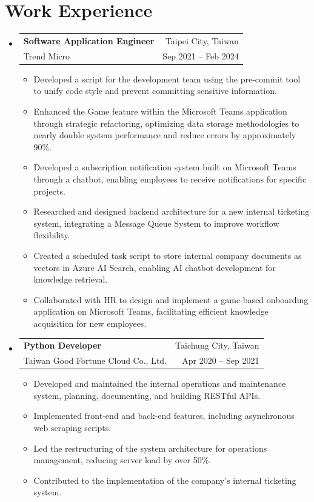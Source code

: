 \documentclass[letterpaper,12pt]{article}
\makeatletter
\newcommand{\resumeItemNH}[1]{
  \item\small{
    {#1 \vspace{-2pt}}
  }
}
\newcommand{\resumeSubheading}[4]{
  \vspace{0pt}\item
    \begin{tabular*}{\textwidth}{l@{\extracolsep{\fill}}r}
      \textbf{#1} & #2 \\
      \small#3 & \small#4 \\
    \end{tabular*}\vspace{-6pt}
}
\newcommand{\resumeSubHeadingListStart}{\begin{itemize}[leftmargin=0pt,label={}]}
\newcommand{\resumeSubHeadingListEnd}{\end{itemize}}
\newcommand{\resumeItemListStart}{\begin{itemize}[leftmargin=*]}
\newcommand{\resumeItemListEnd}{\end{itemize}}
\makeatother
\begin{document}
\section*{Work Experience}
  \resumeSubHeadingListStart
    \resumeSubheading
      {Software Application Engineer}{Taipei City, Taiwan}
      {Trend Micro}{Sep 2021 -- Feb 2024}
      \resumeItemListStart
        \resumeItemNH{Developed a script for the development team using the pre-commit tool to unify code style and prevent committing sensitive information.}
        \resumeItemNH{Enhanced the Game feature within the Microsoft Teams application through strategic refactoring, optimizing data storage methodologies to nearly double system performance and reduce errors by approximately 90\%.}
        \resumeItemNH{Developed a subscription notification system built on Microsoft Teams through a chatbot, enabling employees to receive notifications for specific projects.}
        \resumeItemNH{Researched and designed backend architecture for a new internal ticketing system, integrating a Message Queue System to improve workflow flexibility.}
        \resumeItemNH{Created a scheduled task script to store internal company documents as vectors in Azure AI Search, enabling AI chatbot development for knowledge retrieval.}
        \resumeItemNH{Collaborated with HR to design and implement a game-based onboarding application on Microsoft Teams, facilitating efficient knowledge acquisition for new employees.}
      \resumeItemListEnd
    \resumeSubheading
      {Python Developer}{Taichung City, Taiwan}
      {Taiwan Good Fortune Cloud Co., Ltd.}{Apr 2020 -- Sep 2021}
      \resumeItemListStart
        \resumeItemNH{Developed and maintained the internal operations and maintenance system, planning, documenting, and building RESTful APIs.}
        \resumeItemNH{Implemented front-end and back-end features, including asynchronous web scraping scripts.}
        \resumeItemNH{Led the restructuring of the system architecture for operations management, reducing server load by over 50\%.}
        \resumeItemNH{Contributed to the implementation of the company's internal ticketing system.}
      \resumeItemListEnd
  \resumeSubHeadingListEnd

\end{document}
